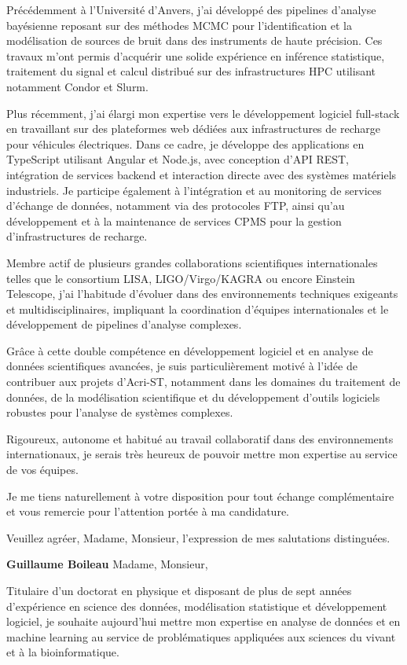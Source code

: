 \documentclass[10pt,a4paper]{../_shared/altacv}
\begin{document}
Précédemment à l’Université d’Anvers, j’ai développé des pipelines d’analyse bayésienne reposant sur des méthodes MCMC pour l’identification et la modélisation de sources de bruit dans des instruments de haute précision. Ces travaux m’ont permis d’acquérir une solide expérience en inférence statistique, traitement du signal et calcul distribué sur des infrastructures HPC utilisant notamment Condor et Slurm.

Plus récemment, j’ai élargi mon expertise vers le développement logiciel full-stack en travaillant sur des plateformes web dédiées aux infrastructures de recharge pour véhicules électriques. Dans ce cadre, je développe des applications en TypeScript utilisant Angular et Node.js, avec conception d’API REST, intégration de services backend et interaction directe avec des systèmes matériels industriels. Je participe également à l’intégration et au monitoring de services d’échange de données, notamment via des protocoles FTP, ainsi qu’au développement et à la maintenance de services CPMS pour la gestion d’infrastructures de recharge.

Membre actif de plusieurs grandes collaborations scientifiques internationales telles que le consortium LISA, LIGO/Virgo/KAGRA ou encore Einstein Telescope, j’ai l’habitude d’évoluer dans des environnements techniques exigeants et multidisciplinaires, impliquant la coordination d’équipes internationales et le développement de pipelines d’analyse complexes.

Grâce à cette double compétence en développement logiciel et en analyse de données scientifiques avancées, je suis particulièrement motivé à l’idée de contribuer aux projets d’Acri-ST, notamment dans les domaines du traitement de données, de la modélisation scientifique et du développement d’outils logiciels robustes pour l’analyse de systèmes complexes.

Rigoureux, autonome et habitué au travail collaboratif dans des environnements internationaux, je serais très heureux de pouvoir mettre mon expertise au service de vos équipes.

Je me tiens naturellement à votre disposition pour tout échange complémentaire et vous remercie pour l’attention portée à ma candidature.

Veuillez agréer, Madame, Monsieur, l’expression de mes salutations distinguées.

\textbf{Guillaume Boileau}
Madame, Monsieur,

Titulaire d’un doctorat en physique et disposant de plus de sept années d’expérience en science des données, modélisation statistique et développement logiciel, je souhaite aujourd’hui mettre mon expertise en analyse de données et en machine learning au service de problématiques appliquées aux sciences du vivant et à la bioinformatique.
\end{document}
